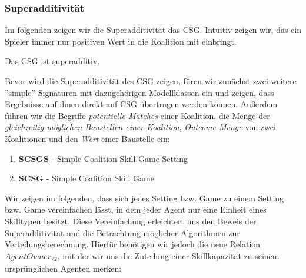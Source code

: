 \subsubsection{Superadditivität}
\label{supadd}
Im folgenden zeigen wir die Superadditivität das CSG. Intuitiv zeigen wir, das ein Spieler immer nur positiven Wert in die Koalition mit einbringt.

\begin{lemma}[Superadditivität]
Das CSG ist superadditiv.
\end{lemma}

Bevor wird die Superadditivität des CSG zeigen, füren wir zunächst zwei weitere ''simple'' Signaturen mit dazugehörigen Modellklassen ein und zeigen, dass Ergebnisse auf ihnen direkt auf CSG übertragen werden können. Außerdem führen wir die Begriffe \textit{potentielle Matches} einer Koalition, die Menge der \textit{gleichzeitig möglichen Baustellen einer Koalition}, \textit{Outcome-Menge} von zwei Koalitionen und den \textit{Wert} einer Baustelle ein:

\begin{enumerate}
  \item \textbf{SCSGS} - Simple Coalition Skill Game Setting
  \item \textbf{SCSG} - Simple Coalition Skill Game
\end{enumerate}

\noindent
Wir zeigen im folgenden, dass sich jedes Setting bzw. Game zu einem Setting bzw. Game vereinfachen lässt, in dem jeder Agent nur eine Einheit eines Skilltypen besitzt. Diese Vereinfachung erleichtert uns den Beweis der Superadditivität und die Betrachtung möglicher Algorithmen zur Verteilungsberechnung. Hierfür benötigen wir jedoch die neue Relation $AgentOwner_{/2}$, mit der wir uns die Zuteilung einer Skillkapazität zu seinem ursprünglichen Agenten merken:

